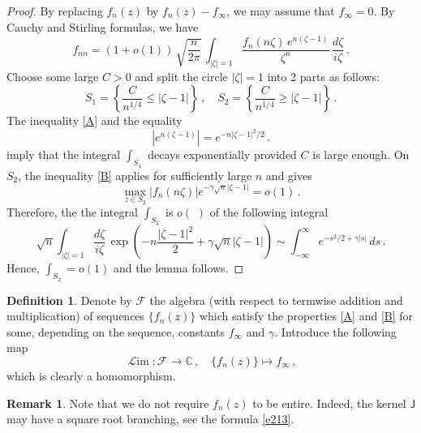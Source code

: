 \documentclass[12pt]{amsart}
\newcommand{\J}{\mathsf{J}}
\newcommand{\C}{\mathbb{C}}
\newcommand{\Lim}{\operatorname{\mathcal{ L}im}}
\newcommand{\g}{\gamma}
\newcommand{\aF}{\mathcal{F}}
\theoremstyle{plain}
\theoremstyle{definition}
\newtheorem{remark}[lemma]{Remark}
\newtheorem{definition}[lemma]{Definition}
\numberwithin{equation}{section}
\begin{document}
\begin{proof} By replacing $f_n(z)$ by $f_n(z)-f_\infty$, we
may assume that $f_\infty=0$. 
By Cauchy and Stirling formulas, we have
%
\begin{equation*}
f_{nn} =(1+o(1))\,  \sqrt{\frac{n}{2\pi}} \, \int_{|\zeta|=1} 
\frac{f_n(n\zeta)\, e^{n(\zeta-1)}}{\zeta^n} \, \frac{d\zeta}{i\zeta}  \,.
\end{equation*}
%
Choose some large $C>0$  and split the 
circle $|\zeta|=1$ into 2  parts as follows:
%
\begin{equation*}
S_1=\left\{ \frac{C}{n^{1/4}}\le |\zeta-1|\right\}\,, \quad
S_2=\left\{ \frac{C}{n^{1/4}}\ge|\zeta-1|\right\} \,.
\end{equation*}
%
The inequality \eqref{A} and the equality  
%
\begin{equation*}
\left|e^{n(\zeta-1)}\right|=e^{-n|\zeta-1|^2/2} \,.
\end{equation*}
%
imply that  the integral $\int_{S_1}$ decays exponentially provided $C$ is large enough. 
On $S_2$,  the inequality \eqref{B} applies for sufficiently large $n$ and gives 
%
\begin{equation*}
\max_{z\in S_2} \left|f_n(n\zeta)\right| e^{-\g\sqrt{n}|\zeta-1|} = o(1) \,.
\end{equation*}
% 
Therefore, the the integral $\int_{S_2}$ is  $o(\,\,)$ of the following integral 
%
\begin{equation*}
\sqrt{n} \int_{|\zeta|=1} \frac{d\zeta}{i\zeta} \,
\exp\left(-n\frac{|\zeta-1|^2}2 + \g\sqrt{n}|\zeta-1|\right) 
\sim \int_{-\infty}^\infty e^{-s^2/2 +\gamma |s|} \, ds \,.
\end{equation*}
%
Hence,  $\int_{S_2}=o(1)$ and the lemma follows.  
\end{proof}
 

\begin{definition} Denote by $\aF$ the algebra
(with respect to termwise addition and multiplication)
 of sequences $\{f_n(z)\}$ which satisfy the 
properties \eqref{A} and \eqref{B} for some, depending on the
sequence,  constants $f_\infty$ and $\g$. Introduce
the following map
%
\begin{equation*}
\Lim:\aF\to \C\,, \quad \{f_n(z)\} \mapsto f_\infty \,,
\end{equation*}
%
which is clearly  a homomorphism.  
\end{definition} 

\begin{remark}
Note that we do not require $f_n(z)$ to be entire. Indeed, the
kernel $\J$ may have a square root branching, see
the formula \eqref{e213}.
\end{remark} 
\end{document}
